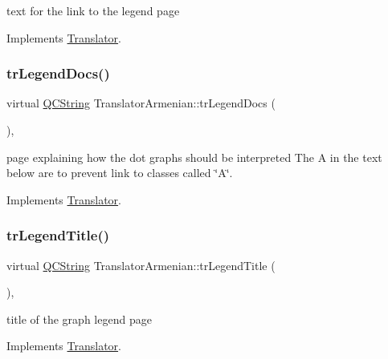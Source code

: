 text for the link to the legend page 

Implements \mbox{\hyperlink{class_translator}{Translator}}.

\mbox{\label{class_translator_armenian_a6ddf2f0726fef0a7fc23af1c259f1588}} 
\subsubsection{\texorpdfstring{trLegendDocs()}{trLegendDocs()}}
{\footnotesize\ttfamily virtual \mbox{\hyperlink{class_q_c_string}{Q\+C\+String}} Translator\+Armenian\+::tr\+Legend\+Docs (\begin{DoxyParamCaption}{ }\end{DoxyParamCaption})\hspace{0.3cm}{\ttfamily [inline]}, {\ttfamily [virtual]}}

page explaining how the dot graph\textquotesingle{}s should be interpreted The A in the text below are to prevent link to classes called \char`\"{}\+A\char`\"{}. 

Implements \mbox{\hyperlink{class_translator}{Translator}}.

\mbox{\label{class_translator_armenian_a86d893ed59368d691cf5b9df301e5352}} 
\subsubsection{\texorpdfstring{trLegendTitle()}{trLegendTitle()}}
{\footnotesize\ttfamily virtual \mbox{\hyperlink{class_q_c_string}{Q\+C\+String}} Translator\+Armenian\+::tr\+Legend\+Title (\begin{DoxyParamCaption}{ }\end{DoxyParamCaption})\hspace{0.3cm}{\ttfamily [inline]}, {\ttfamily [virtual]}}

title of the graph legend page 

Implements \mbox{\hyperlink{class_translator}{Translator}}.

\mbox{\label{class_translator_armenian_abacd9ddaa6350063bf3be8a7b1d2dec5}} 
